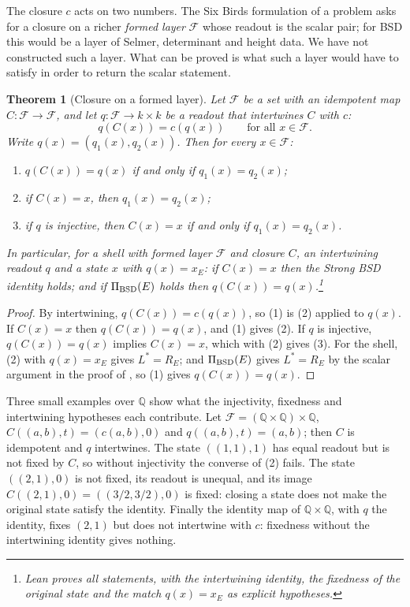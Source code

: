 \documentclass[11pt]{article}
\newtheorem{theorem}{Theorem}[section]
\theoremstyle{definition}
\newcommand{\Q}{\mathbb{Q}}
\begin{document}
The closure $c$ acts on two numbers.  The Six Birds formulation of a
problem asks for a closure on a richer \emph{formed layer} $\mathcal F$
whose readout is the scalar pair; for BSD this would be a layer of
Selmer, determinant and height data.  We have not constructed such a
layer.  What can be proved is what such a layer would have to satisfy in
order to return the scalar statement.

\begin{theorem}[Closure on a formed layer]\label{thm:closure:formed-closure-bridge}
Let $\mathcal F$ be a set with an idempotent map $C:\mathcal F\to\mathcal
F$, and let $q:\mathcal F\to k\times k$ be a readout that intertwines $C$
with $c$:
\[
  q(C(x))=c(q(x))\qquad\text{for all }x\in\mathcal F .
\]
Write $q(x)=(q_1(x),q_2(x))$.  Then for every $x\in\mathcal F$:
\begin{enumerate}
\item $q(C(x))=q(x)$ if and only if $q_1(x)=q_2(x)$;
\item if $C(x)=x$, then $q_1(x)=q_2(x)$;
\item if $q$ is injective, then $C(x)=x$ if and only if $q_1(x)=q_2(x)$.
\end{enumerate}
In particular, for a shell with formed layer $\mathcal F$ and closure $C$,
an intertwining readout $q$ and a state $x$ with $q(x)=x_E$: if
$C(x)=x$ then the Strong BSD identity holds; and if $\Pi_{\mathrm{BSD}}(E)$ holds then
$q(C(x))=q(x)$.\footnote{Lean proves all statements, with the intertwining identity, the
fixedness of the original state and the match $q(x)=x_E$ as explicit
hypotheses.}
\end{theorem}

\begin{proof}
By intertwining, $q(C(x))=c(q(x))$, so (1) is
(2) applied to $q(x)$.  If
$C(x)=x$ then $q(C(x))=q(x)$, and (1) gives (2).  If $q$ is injective,
$q(C(x))=q(x)$ implies $C(x)=x$, which with (2) gives (3).  For the shell,
(2) with $q(x)=x_E$ gives $L^*=R_E$; and $\Pi_{\mathrm{BSD}}(E)$ gives $L^*=R_E$ by
the scalar argument in the proof of
, so (1) gives $q(C(x))=q(x)$.
\end{proof}

Three small examples over $\Q$ show what the injectivity, fixedness and
intertwining hypotheses each contribute.  Let
$\mathcal F=(\Q\times\Q)\times\Q$, $C((a,b),t)=(c(a,b),0)$ and
$q((a,b),t)=(a,b)$; then $C$ is idempotent and $q$ intertwines.  The state
$((1,1),1)$ has equal readout but is not fixed by $C$, so without
injectivity the converse of (2) fails.  The state $((2,1),0)$ is not
fixed, its readout is unequal, and its image $C((2,1),0)=((3/2,3/2),0)$
is fixed: closing a state does not make the original state satisfy the
identity.  Finally the identity map of $\Q\times\Q$, with $q$ the
identity, fixes $(2,1)$ but does not intertwine with $c$: fixedness
without the intertwining identity gives nothing.
\end{document}
